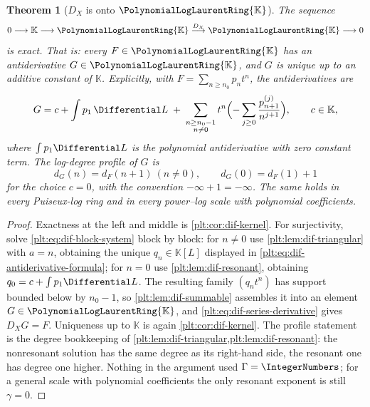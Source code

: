 \documentclass[11pt,oneside]{article}
\theoremstyle{plain}
\newtheorem{theorem}{Theorem}[section]
\theoremstyle{definition}
\theoremstyle{remark}
\newcommand{\K}{\mathbb{K}}
\newcommand{\PLlau}{\PolynomialLogLaurentRing{\K}}       %
\newcommand{\DX}{D_{X}}                                  %
\newcommand{\dprofile}[1]{d_{#1}}                        %
\begin{document}
\begin{theorem}[\(\DX\) is onto \(\PLlau\)]\label{plt:thm:dif-antiderivative}
The sequence
\begin{equation}\label{plt:eq:dif-exact-sequence}
  0\longrightarrow\K\longrightarrow\PLlau
  \stackrel{\DX}{\longrightarrow}\PLlau\longrightarrow0
\end{equation}
is exact.  That is: every \(F\in\PLlau\) has an antiderivative \(G\in\PLlau\),
and \(G\) is unique up to an additive constant of \(\K\).  Explicitly, with
\(F=\sum_{n\ge n_{0}}p_{n}t^{n}\), the antiderivatives are
\begin{equation}\label{plt:eq:dif-antiderivative-formula}
  G=c+\int p_{1}\,\Differential L
   \;+\;\sum_{\substack{n\ge n_{0}-1\\ n\ne0}}
   t^{n}\Bigl(-\sum_{j\ge0}\frac{p_{n+1}^{(j)}}{n^{j+1}}\Bigr),
   \qquad c\in\K,
\end{equation}
where \(\int p_{1}\Differential L\) is the polynomial antiderivative with zero
constant term.  The log-degree profile of \(G\) is
\begin{equation}\label{plt:eq:dif-profile}
  \dprofile{G}(n)=\dprofile{F}(n+1)\ (n\ne0),
  \qquad
  \dprofile{G}(0)=\dprofile{F}(1)+1
\end{equation}
for the choice \(c=0\), with the convention \(-\infty+1=-\infty\).  The same
holds in every Puiseux-log ring and in every power--log scale with polynomial
coefficients.
\end{theorem}

\begin{proof}
Exactness at the left and middle is \cref{plt:cor:dif-kernel}.  For
surjectivity, solve \cref{plt:eq:dif-block-system} block by block:
for \(n\ne0\) use \cref{plt:lem:dif-triangular} with \(a=n\), obtaining the
unique \(q_{n}\in\K[L]\) displayed in
\cref{plt:eq:dif-antiderivative-formula}; for \(n=0\) use
\cref{plt:lem:dif-resonant}, obtaining \(q_{0}=c+\int p_{1}\Differential L\).
The resulting family \((q_{n}t^{n})\) has support bounded below by
\(n_{0}-1\), so \cref{plt:lem:dif-summable} assembles it into an element
\(G\in\PLlau\), and \cref{plt:eq:dif-series-derivative} gives \(\DX G=F\).
Uniqueness up to \(\K\) is again \cref{plt:cor:dif-kernel}.  The profile
statement is the degree bookkeeping of
\cref{plt:lem:dif-triangular,plt:lem:dif-resonant}: the nonresonant solution
has the same degree as its right-hand side, the resonant one has degree one
higher.  Nothing in the argument used \(\Gamma=\IntegerNumbers\); for a general
scale with polynomial coefficients the only resonant exponent is still
\(\gamma=0\).
\end{proof}
\end{document}
